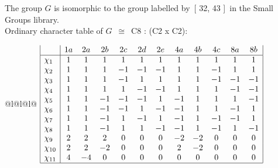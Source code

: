 \documentclass[varwidth=\maxdimen,border=10]{standalone}
\begin{document}
The group $G$ is isomorphic to the group labelled by\ [ 32, 43 ]\ in the Small Groups library.\\
Ordinary character table of $G$\ $\cong$\ C8 : (C2 x C2):\\
\begin{center}
\begin{tabular}{@{}l@{}l@{}l@{}}
\hline
\(\begin{array}{|l|ccccccccccc|}
  & 1a & 2a & 2b & 2c & 2d & 2e & 4a & 4b & 4c & 8a & 8b\\ \hline
\chi_{1} & 1 & 1 & 1 & 1 & 1 & 1 & 1 & 1 & 1 & 1 & 1\\
\chi_{2} & 1 & 1 & 1 & -1 & -1 & -1 & 1 & 1 & -1 & 1 & 1\\
\chi_{3} & 1 & 1 & 1 & -1 & 1 & 1 & 1 & 1 & -1 & -1 & -1\\
\chi_{4} & 1 & 1 & 1 & 1 & -1 & -1 & 1 & 1 & 1 & -1 & -1\\
\chi_{5} & 1 & 1 & -1 & -1 & -1 & 1 & -1 & 1 & 1 & 1 & -1\\
\chi_{6} & 1 & 1 & -1 & -1 & 1 & -1 & -1 & 1 & 1 & -1 & 1\\
\chi_{7} & 1 & 1 & -1 & 1 & -1 & 1 & -1 & 1 & -1 & -1 & 1\\
\chi_{8} & 1 & 1 & -1 & 1 & 1 & -1 & -1 & 1 & -1 & 1 & -1\\
\chi_{9} & 2 & 2 & 2 & 0 & 0 & 0 & -2 & -2 & 0 & 0 & 0\\
\chi_{10} & 2 & 2 & -2 & 0 & 0 & 0 & 2 & -2 & 0 & 0 & 0\\
\chi_{11} & 4 & -4 & 0 & 0 & 0 & 0 & 0 & 0 & 0 & 0 & 0\\
\hline
\end{array}\)\\
\end{tabular}
\end{center}
\end{document}

